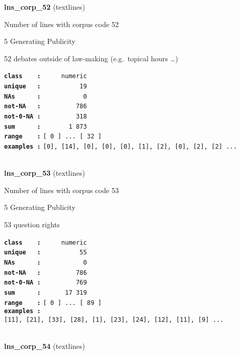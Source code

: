 \documentclass[]{article}
\begin{document}
\textbf{lns\_corp\_52} (textlines)

Number of lines with corpus code 52

5 Generating Publicity

52 debates outside of law-making (e.g.~topical hours \ldots{})

\textbf{\texttt{class\ \ \ \ :}} \texttt{~~~~~numeric}\\
\textbf{\texttt{unique\ \ \ :}} \texttt{~~~~~~~~~~19}\\
\textbf{\texttt{NAs\ \ \ \ \ \ :}} \texttt{~~~~~~~~~~~0}\\
\textbf{\texttt{not-NA\ \ \ :}} \texttt{~~~~~~~~~786}\\
\textbf{\texttt{not-0-NA\ :}} \texttt{~~~~~~~~~318}\\
\textbf{\texttt{sum\ \ \ \ \ \ :}} \texttt{~~~~~~~1~873}\\
\textbf{\texttt{range\ \ \ \ :}}
\texttt{{[}\ 0\ {]}\ ...\ {[}\ 32\ {]}}\\
\textbf{\texttt{examples\ :}}
\texttt{{[}0{]},\ {[}14{]},\ {[}0{]},\ {[}0{]},\ {[}0{]},\ {[}1{]},\ {[}2{]},\ {[}0{]},\ {[}2{]},\ {[}2{]}\ ...}\\

~

\textbf{lns\_corp\_53} (textlines)

Number of lines with corpus code 53

5 Generating Publicity

53 question rights

\textbf{\texttt{class\ \ \ \ :}} \texttt{~~~~~numeric}\\
\textbf{\texttt{unique\ \ \ :}} \texttt{~~~~~~~~~~55}\\
\textbf{\texttt{NAs\ \ \ \ \ \ :}} \texttt{~~~~~~~~~~~0}\\
\textbf{\texttt{not-NA\ \ \ :}} \texttt{~~~~~~~~~786}\\
\textbf{\texttt{not-0-NA\ :}} \texttt{~~~~~~~~~769}\\
\textbf{\texttt{sum\ \ \ \ \ \ :}} \texttt{~~~~~~17~319}\\
\textbf{\texttt{range\ \ \ \ :}}
\texttt{{[}\ 0\ {]}\ ...\ {[}\ 89\ {]}}\\
\textbf{\texttt{examples\ :}}
\texttt{{[}11{]},\ {[}21{]},\ {[}33{]},\ {[}28{]},\ {[}1{]},\ {[}23{]},\ {[}24{]},\ {[}12{]},\ {[}11{]},\ {[}9{]}\ ...}\\

~

\textbf{lns\_corp\_54} (textlines)
\end{document}
